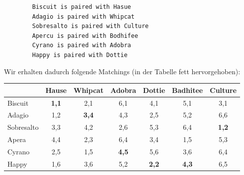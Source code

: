 \begin{enumerate}[label=(\alph*)]
\begin{lstlisting}
        Biscuit is paired with Hasue
        Adagio is paired with Whipcat
        Sobresalto is paired with Culture
        Apercu is paired with Bodhifee
        Cyrano is paired with Adobra
        Happy is paired with Dottie
        \end{lstlisting} \par
        \clearpage 
        Wir erhalten dadurch folgende Matchings (in der Tabelle fett hervorgehoben):
        \begin{table}[h]\centering
            \begin{tabular}{|l|c|c|c|c|c|c|}
            \hline
            ~          & Hause     & Whipcat   & Adobra   & Dottie   & Badhitee   & Culture   \\ \hline
            Biscuit    & {\bf 1,1} & 2,1       & 6,1      & 4,1      & 5,1        & 3,1       \\ \hline
            Adagio     & 1,2       & {\bf3,4}  & 4,3      & 2,5      & 5,2        & 6,6       \\ \hline
            Sobresalto & 3,3       & 4,2       & 2,6      & 5,3      & 6,4        & {\bf1,2}  \\ \hline
            Apera      & 4,4       & 2,3       & 6,4      & 3,4      & 1,5        & 5,3       \\ \hline
            Cyrano     & 2,5       & 1,5       & {\bf4,5} & 5,6      & 3,6        & 6,4       \\ \hline
            Happy      & 1,6       & 3,6       & 5,2      & {\bf2,2} & {\bf4,3}   & 6,5       \\ \hline
            \end{tabular}
        \end{table}
    \end{enumerate}







